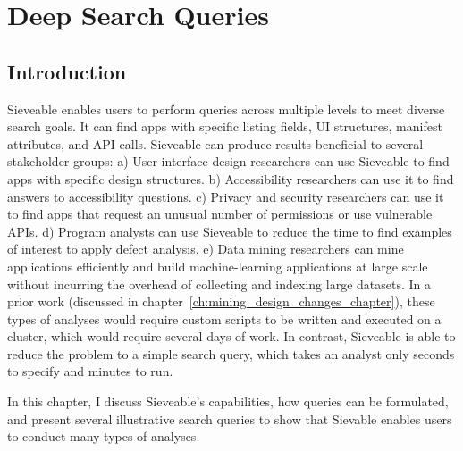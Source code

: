 \chapter{Deep Search Queries}
\label{ch:queries_chapter}

\section{Introduction}
Sieveable enables users to perform queries across multiple levels to meet diverse search goals.
It can find apps with specific listing fields, UI structures, manifest attributes, and API calls.
Sieveable can produce results beneficial to several stakeholder groups:
a) User interface design researchers can use Sieveable to find apps with specific design structures.
b) Accessibility researchers can use it to find answers to accessibility questions.
c) Privacy and security researchers can use it to find apps that request an unusual number of permissions or use vulnerable APIs.
d) Program analysts can use Sieveable to reduce the time to find examples of interest to apply defect analysis.
e) Data mining researchers can mine applications efficiently and build machine-learning applications at large scale without incurring the overhead of collecting and indexing large datasets.
In a prior work (discussed in chapter~\ref{ch:mining_design_changes_chapter}), these types of analyses would require custom scripts to be written and executed on a cluster, which would require several days of work.
In contrast, Sieveable is able to reduce the problem to a simple search query, which takes an analyst only seconds to specify and minutes to run.

In this chapter, I discuss Sieveable's capabilities, how queries can be formulated, and present several illustrative search queries to show that Sievable enables users to conduct many types of analyses.
